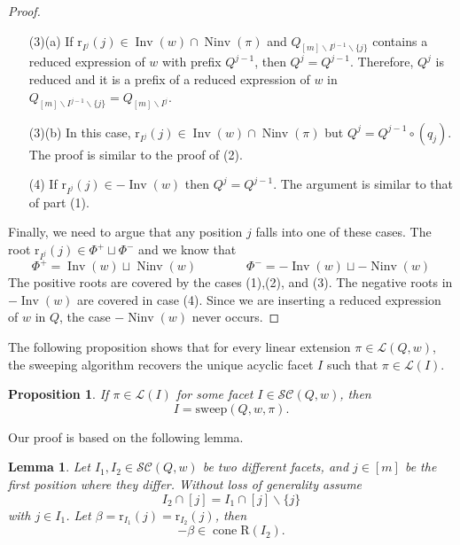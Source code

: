 \documentclass{amsart}
\newtheorem{proposition}[theorem]{Proposition}
\newtheorem{lemma}[theorem]{Lemma}
\theoremstyle{definition}
\DeclareMathOperator{\cone}{cone} %
\DeclareMathOperator{\Inv}{Inv} %
\DeclareMathOperator{\Ninv}{Ninv} %
\newcommand{\linearExtensions}{\mathcal{L}} %
\newcommand{\subwordComplex}{\mathcal{SC}} %
\newcommand{\Roots}{\mathrm{R}} %
\newcommand{\rootFunction}[2]{\mathrm{r}_{#1}(#2)} %
\newcommand{\sweepingAlgorithm}{\mathrm{sweep}} %
\begin{document}
\begin{proof}
\begin{enumerate}
    If $j\in \widetilde I$, then we can flip it to a position $j'>j$ (by Lemma~\ref{lem_rootfunction_flips}~\eqref{lem_rootfunction_flips2}), creating a new reduced expression $\widetilde Q'$ of $w$ which uses $q_j$, and thus has $Q^j$ as a prefix. 


    \item[(3)(a)] If $\rootFunction{I^j}{j}\in \Inv(w) \cap \Ninv (\pi)$ and $Q_{[m]\smallsetminus I^{j-1}\smallsetminus \{j\}}$ contains a reduced expression of $w$ with prefix $Q^{j-1}$, then $Q^j=Q^{j-1}$.
    Therefore, $Q^j$ is reduced and it is a prefix of a reduced expression of $w$ in 
    $Q_{[m]\smallsetminus I^{j-1}\smallsetminus \{j\}}=Q_{[m]\smallsetminus I^j}$.

    \item[(3)(b)] In this case, $\rootFunction{I^j}{j}\in \Inv(w) \cap \Ninv (\pi)$ but $Q^j= Q^{j-1}\circ (q_j)$. The proof is similar to the proof of (2). 

    \item[(4)] If $\rootFunction{I^j}{j}\in -\Inv(w)$ then $Q^j=Q^{j-1}$. The argument is similar to that of part (1). 
    \end{enumerate}

Finally, we need to argue that any position $j$ falls into one of these cases. 
The root $\rootFunction{I^j}{j}\in \Phi^+ \sqcup \Phi^-$ and we know that
\[
\Phi^+ = \Inv(w) \sqcup \Ninv(w) \qquad \qquad
\Phi^- = -\Inv(w) \sqcup -\Ninv(w)  
\]
The positive roots are covered by the cases (1),(2), and (3). 
The negative roots in $-\Inv(w)$ are covered in case (4). 
Since we are inserting a reduced expression of $w$ in $Q$, the case $-\Ninv(w)$ never occurs.  
\end{proof}

The following proposition shows that for every linear extension $\pi \in \linearExtensions(Q,w)$, the sweeping algorithm recovers the unique acyclic facet $I$ such that $\pi \in \linearExtensions(I)$.

\begin{proposition}
\label{prop_sweeping2}
    If $\pi\in \linearExtensions(I)$ for some facet $I\in \subwordComplex(Q,w)$, then 
    \[
I = \sweepingAlgorithm(Q,w,\pi).
    \]
\end{proposition}

Our proof is based on the following lemma.

\begin{lemma}\label{lem_negativeroot}
    Let $I_1,I_2\in \subwordComplex(Q,w)$ be two different facets, and $j\in [m]$ be the first position where they differ. Without loss of generality assume 
    \[
I_2\cap [j] = I_1\cap [j] \smallsetminus \{j\}
    \]
with $j\in I_1$. Let $\beta=\rootFunction{I_1}{j}=\rootFunction{I_2}{j}$, then 
\[
-\beta \in \cone \Roots(I_2).
\]
\end{lemma}
\end{document}
